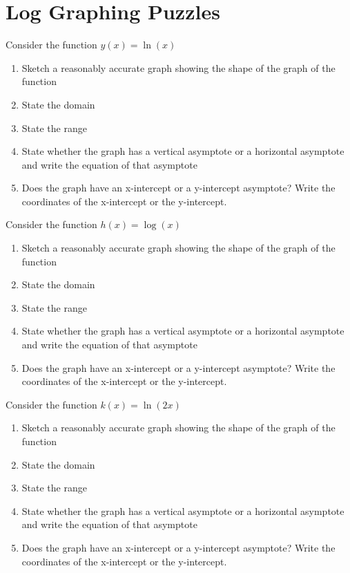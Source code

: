 \section{Log Graphing Puzzles}

\begin{puzzle} Consider the function \( y(x)= \ln(x)\)
    \begin{enumerate}
        \item Sketch a reasonably accurate graph showing the shape of the graph of the function
        \item State the domain
        \item State the range
        \item State whether the graph has a vertical asymptote or a horizontal asymptote and write the equation of that asymptote
        \item Does the graph have an x-intercept or a y-intercept asymptote? Write the coordinates of the x-intercept or the y-intercept.
    \end{enumerate}
\end{puzzle}

\begin{puzzle} Consider the function \( h(x)= \log(x)\)
    \begin{enumerate}
        \item Sketch a reasonably accurate graph showing the shape of the graph of the function
        \item State the domain
        \item State the range
        \item State whether the graph has a vertical asymptote or a horizontal asymptote and write the equation of that asymptote
        \item Does the graph have an x-intercept or a y-intercept asymptote? Write the coordinates of the x-intercept or the y-intercept.
    \end{enumerate}
\end{puzzle}


\begin{puzzle} Consider the function \( k(x)= \ln(2x)\)
    \begin{enumerate}
        \item Sketch a reasonably accurate graph showing the shape of the graph of the function
        \item State the domain
        \item State the range
        \item State whether the graph has a vertical asymptote or a horizontal asymptote and write the equation of that asymptote
        \item Does the graph have an x-intercept or a y-intercept asymptote? Write the coordinates of the x-intercept or the y-intercept.
    \end{enumerate}
\end{puzzle}

